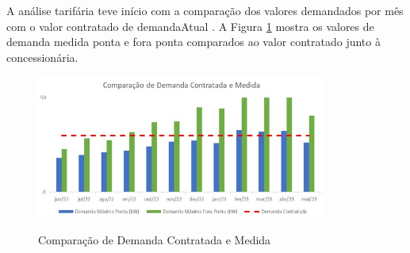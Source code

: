 \documentclass[a4paper,12pt]{abntex2}
\begin{document}
    A análise tarifária teve início com a comparação dos valores demandados por mês com o 
    valor contratado de {{ demandaAtual }}. A Figura \ref{fig:grafico2} mostra os valores de demanda medida ponta e fora 
    ponta comparados ao valor contratado junto à concessionária.

    \begin{figure}[!ht]
        \centering
        \caption{Comparação de Demanda Contratada e Medida}
        \includegraphics[width=0.85\textwidth]{templates/FIGS/grafico2}
        \label{fig:grafico2}
    \end{figure}
\end{document}
